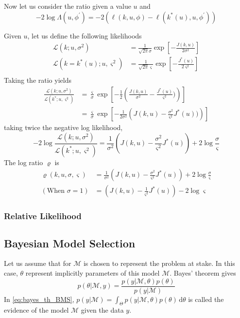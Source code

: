\documentclass[a4paper,11pt]{article}
\theoremstyle{defi}
\numberwithin{thmCounter}{section}
\begin{document}
Now let us consider the ratio given a value $u$ and  
\begin{equation}
  -2\log\Lambda(u, \phi^\prime) = -2\left(\ell(k, u, \phi) - \ell(k^*(u), u, \phi^\prime) \right)
\end{equation}

Given $u$, let us define the following likelihoods
\begin{align}
  \mathcal{L}(k ; u, \sigma^2) &= \frac{1}{\sqrt{2\pi}\sigma}\exp\left[-\frac{J(k,u)}{2\sigma^2}\right] \\
  \mathcal{L}(k=k^*(u) ; u, \varsigma^2) &= \frac{1}{\sqrt{2\pi}\varsigma}\exp\left[-\frac{J^*(u)}{2\varsigma^2}\right] \\
\end{align}
Taking the ratio yields
\begin{align}
  \frac{\mathcal{L}(k;u,\sigma^2)}{\mathcal{L}(k^*;u,\varsigma^2)} &= \frac{\varsigma}{\sigma}\exp\left[-\frac{1}{2}\left(\frac{J(k,u)}{\sigma^2} - \frac{J^*(u)}{\varsigma^2})\right)\right] \\
                                                                   &= \frac{\varsigma}{\sigma}\exp\left[-\frac{1}{2\sigma^2}\left(J(k,u)- \frac{\sigma^2}{\varsigma^2}J^*(u))\right)\right]
\end{align}
taking twice the negative log likelihood,
\begin{equation}
  -2\log \frac{\mathcal{L}(k;u,\sigma^2)}{\mathcal{L}(k^*;u,\varsigma^2)} = \frac{1}{\sigma^2}\left(J(k,u) - \frac{\sigma^2}{\varsigma^2}J^*(u)\right) +2\log\frac{\sigma}{\varsigma}
\end{equation}
The log ratio $\varrho$ is
\begin{align}
  \varrho(k, u, \sigma, \varsigma) &= \frac{1}{\sigma^2}\left(J(k,u) - \frac{\sigma^2}{\varsigma^2}J^*(u)\right) +2\log\frac{\sigma}{\varsigma} \\
  (\text{When } \sigma=1)                  &  = \left(J(k,u) - \frac{1}{\varsigma^2}J^*(u)\right) - 2\log\varsigma
\end{align}


\subsubsection{Relative Likelihood}
\label{sec:relative_likelihood}
\subsection{Bayesian Model Selection}
\label{sec:bayesian_model_selection}
Let us assume that for $\mathcal{M}$ is chosen to represent the problem at stake. In this case, $\theta$ represent implicitly parameters of this model $\mathcal{M}$. Bayes' theorem gives
\begin{equation}
  \label{eq:bayes_th_BMS}
  p(\theta | \mathcal{M}, y) = \frac{p(y | \mathcal{M}, \theta)p(\theta)}{p(y | \mathcal{M})}
\end{equation}
In \cref{eq:bayes_th_BMS}, $p(y | \mathcal{M}) = \int_{\Theta}p(y | \mathcal{M}, \theta)p(\theta) \,\mathrm{d}\theta$ is called the evidence of the model $\mathcal{M}$ given the data $y$.
\end{document}
